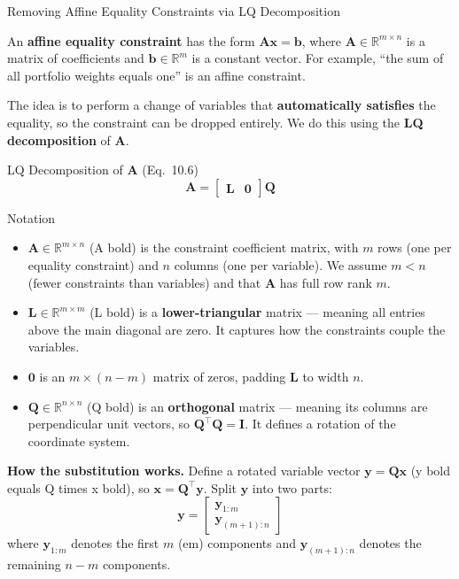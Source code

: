 \documentclass[aspectratio=169,10pt]{beamer}
\newcommand{\R}{\mathbb{R}}
\newcommand{\bx}{\mathbf{x}}
\newcommand{\bA}{\mathbf{A}}
\newcommand{\bb}{\mathbf{b}}
\newcommand{\bQ}{\mathbf{Q}}
\newcommand{\bL}{\mathbf{L}}
\newcommand{\by}{\mathbf{y}}
\begin{document}
\begin{frame}[allowframebreaks]{Removing Affine Equality Constraints via LQ Decomposition}

  An \textbf{affine equality constraint} has the form $\bA\bx = \bb$, where
  $\bA \in \R^{m \times n}$ is a matrix of coefficients and $\bb \in \R^m$ is
  a constant vector.  For example, ``the sum of all portfolio weights equals
  one'' is an affine constraint.

  The idea is to perform a change of variables that \textbf{automatically
  satisfies} the equality, so the constraint can be dropped entirely.  We do
  this using the \textbf{LQ decomposition} of $\bA$.

  \begin{block}{LQ Decomposition of $\bA$ (Eq.~10.6)}
    \[
      \bA = \begin{bmatrix}\bL & \mathbf{0}\end{bmatrix}\bQ
    \]
  \end{block}

  \begin{block}{Notation}
    \begin{itemize}
      \item $\bA \in \R^{m \times n}$ (A bold) is the constraint coefficient
            matrix, with $m$ rows (one per equality constraint) and $n$ columns
            (one per variable).  We assume $m < n$ (fewer constraints than
            variables) and that $\bA$ has full row rank $m$.
      \item $\bL \in \R^{m \times m}$ (L bold) is a \textbf{lower-triangular}
            matrix --- meaning all entries above the main diagonal are zero.
            It captures how the constraints couple the variables.
      \item $\mathbf{0}$ is an $m \times (n-m)$ matrix of zeros, padding $\bL$
            to width $n$.
      \item $\bQ \in \R^{n \times n}$ (Q bold) is an \textbf{orthogonal} matrix
            --- meaning its columns are perpendicular unit vectors, so
            $\bQ^\top \bQ = \mathbf{I}$.  It defines a rotation of the
            coordinate system.
    \end{itemize}
  \end{block}

  \framebreak

  \textbf{How the substitution works.}  Define a rotated variable vector
  $\by = \bQ\bx$ (y bold equals Q times x bold), so $\bx = \bQ^\top \by$.
  Split $\by$ into two parts:
  \[
    \by = \begin{bmatrix}\by_{1:m}\\\by_{(m+1):n}\end{bmatrix}
  \]
  where $\by_{1:m}$ denotes the first $m$ (em) components and
  $\by_{(m+1):n}$ denotes the remaining $n - m$ components.


\end{frame}
\end{document}
